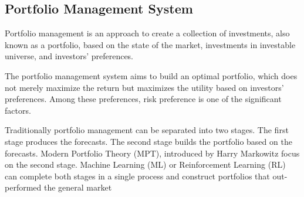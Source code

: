 \subsection {Portfolio Management System}
Portfolio management is an approach to create a collection of investments, also known as a portfolio, based on the state of the market, investments in investable universe, and investors' preferences.

The portfolio management system aims to build an optimal portfolio, which does not merely maximize the return but maximizes the utility based on investors' preferences. Among these preferences, risk preference is one of the significant factors.

Traditionally portfolio management can be separated into two stages. The first stage produces the forecasts. The second stage builds the portfolio based on the forecasts.  Modern Portfolio Theory (MPT), introduced by  Harry Markowitz \cite{10.2307/2975974} focus on the second stage. Machine Learning (ML) or Reinforcement Learning (RL) can complete both stages in a single process and construct portfolios that out-performed the general market\cite{KRAUSS2017689, moody2001learning}
